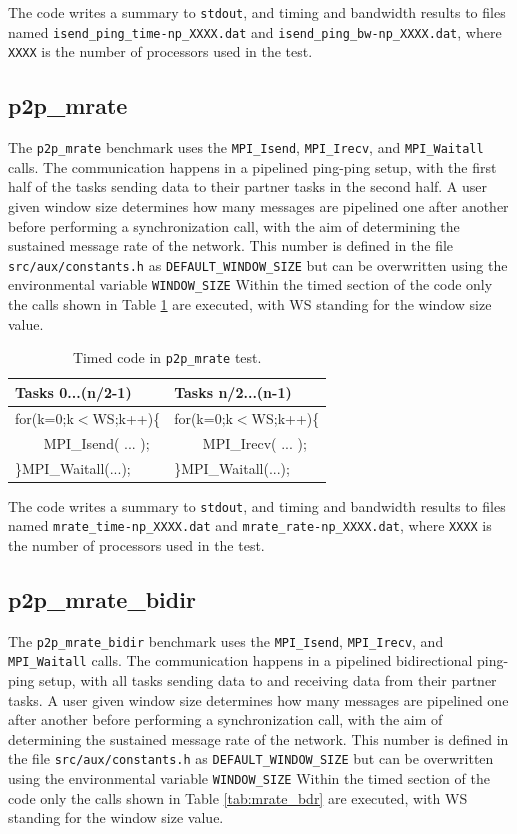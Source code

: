 \documentclass[10pt,a4paper]{report}
\begin{document}
The code writes a summary to \verb+stdout+, and timing and bandwidth results to files named \verb+isend_ping_time-np_XXXX.dat+ and \verb+isend_ping_bw-np_XXXX.dat+, where \verb+XXXX+ is the number of processors used in the test.

\FloatBarrier

\subsection{p2p\_mrate}
The \verb+p2p_mrate+ benchmark uses the \verb+MPI_Isend+, \verb+MPI_Irecv+, and \verb+MPI_Waitall+ calls. The communication happens in a pipelined ping-ping setup, with the first half of the tasks sending data to their partner tasks in the second half. A user given window size determines how many messages are pipelined one after another before performing a synchronization call, with the aim of determining the sustained message rate of the network. This number is defined in the file \verb+src/aux/constants.h+ as \verb+DEFAULT_WINDOW_SIZE+ but can be overwritten using the environmental variable \verb+WINDOW_SIZE+  Within the timed section of the code only the calls shown in Table \ref{tab:mrate} are executed, with WS standing for the window size value.

\begin{table}[ht]
\centering
\caption{Timed code in \texttt{p2p\_mrate} test.}
\label{tab:mrate}
\begin{tabular}{|l|l|}
\hline
\bf{Tasks 0...(n/2-1)}	& \bf{Tasks n/2...(n-1)}\\\hline
for(k=0;k$<$WS;k++)\{     & for(k=0;k$<$WS;k++)\{ \\
\verb+    +MPI\_Isend( ... );      & \verb+    +MPI\_Irecv( ... );\\
\}MPI\_Waitall(...);    & \}MPI\_Waitall(...);\\\hline
\end{tabular}
\end{table}

The code writes a summary to \verb+stdout+, and timing and bandwidth results to files named \verb+mrate_time-np_XXXX.dat+ and \verb+mrate_rate-np_XXXX.dat+, where \verb+XXXX+ is the number of processors used in the test.

\FloatBarrier

\subsection{p2p\_mrate\_bidir}
The \verb+p2p_mrate_bidir+ benchmark uses the \verb+MPI_Isend+, \verb+MPI_Irecv+, and \verb+MPI_Waitall+ calls. The communication happens in a pipelined bidirectional ping-ping setup, with all tasks sending data to and receiving data from their partner tasks. A user given window size determines how many messages are pipelined one after another before performing a synchronization call, with the aim of determining the sustained message rate of the network. This number is defined in the file \verb+src/aux/constants.h+ as \verb+DEFAULT_WINDOW_SIZE+ but can be overwritten using the environmental variable \verb+WINDOW_SIZE+  Within the timed section of the code only the calls shown in Table \ref{tab:mrate_bdr} are executed, with WS standing for the window size value.
\end{document}
